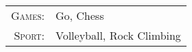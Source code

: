 \begin{tabular}{rl}
   \textsc{Games: } & Go, Chess \\
   \textsc{Sport:} & Volleyball, Rock Climbing \\
\end{tabular}